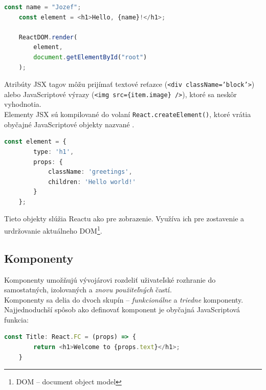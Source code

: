 \begin{lstlisting}[language=TypeScript, caption=Príklad využitia JSX v~React aplikácií. \cite{React}]
	const name = "Jozef";
	const element = <h1>Hello, {name}!</h1>;

	ReactDOM.render(
		element,
		document.getElementById("root")
	);
\end{lstlisting}

\medskip

\noindent Atribúty JSX tagov môžu prijímať textové reťazce (\texttt{<div className='block'>}) alebo JavaScriptové výrazy (\texttt{<img src=\{item.image\} />}), ktoré sa neskôr vyhodnotia. \\

\noindent Elementy JSX sú kompilované do volaní \texttt{React.createElement()}, ktoré vrátia obyčajné JavaScriptové objekty nazvané . \cite{React} \\

\begin{lstlisting}[language=TypeScript, caption=Príklad jednoduchého React elementu po kompilácií. \cite{React}]
	const element = {
		type: 'h1',
		props: {
			className: 'greetings',
			children: 'Hello world!'
		}
	};
\end{lstlisting}

\medskip

\noindent Tieto objekty slúžia Reactu ako  pre zobrazenie. Využíva ich pre zostavenie a urdržovanie aktuálneho DOM\footnote{DOM -- document object model}. \cite{React}

\subsection{Komponenty}
\label{theory:components}
Komponenty umožňujú vývojárovi rozdeliť uživateľské rozhranie do samostatných, izolovaných a \emph{znovu použiteľných} častí. \cite{React} \\

\noindent Komponenty sa delia do dvoch skupín -- \emph{funkcionálne} a \emph{triedne} komponenty. Najjednoduchší spôsob ako definovať komponent je obyčajná JavaScriptová funkcia: \\

\begin{lstlisting}[language=TypeScript, caption=Príklad definície funkcionálneho komponentu.]
	const Title: React.FC = (props) => {
		return <h1>Welcome to {props.text}</h1>;
	}
\end{lstlisting}

